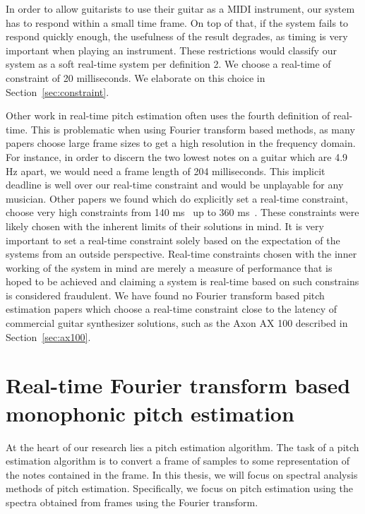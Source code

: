 \documentclass[a4paper,10pt,twocolumn]{article}
\begin{document}
In order to allow guitarists to use their guitar as a MIDI instrument, our system has to respond within a small time frame. On top of that, if the system fails to respond quickly enough, the usefulness of the result degrades, as timing is very important when playing an instrument. These restrictions would classify our system as a soft real-time system per definition 2. We choose a real-time of constraint of 20 milliseconds. We elaborate on this choice in Section~\ref{sec:constraint}.

Other work in real-time pitch estimation often uses the fourth definition of real-time. This is problematic when using Fourier transform based methods, as many papers choose large frame sizes to get a high resolution in the frequency domain. For instance, in order to discern the two lowest notes on a guitar which are 4.9 Hz apart, we would need a frame length of 204 milliseconds. This implicit deadline is well over our real-time constraint and would be unplayable for any musician. Other papers we found which do explicitly set a real-time constraint, choose very high constraints from 140 ms~\cite{sloomboi} up to 360 ms~\cite{sloomboi2}. These constraints were likely chosen with the inherent limits of their solutions in mind. It is very important to set a real-time constraint solely based on the expectation of the systems from an outside perspective. Real-time constraints chosen with the inner working of the system in mind are merely a measure of performance that is hoped to be achieved and claiming a system is real-time based on such constrains is considered fraudulent. We have found no Fourier transform based pitch estimation papers which choose a real-time constraint close to the latency of commercial guitar synthesizer solutions, such as the Axon AX 100 described in Section~\ref{sec:ax100}.



\section{Real-time Fourier transform based monophonic pitch estimation}
At the heart of our research lies a pitch estimation algorithm. The task of a pitch estimation algorithm is to convert a frame of samples to some representation of the notes contained in the frame. In this thesis, we will focus on spectral analysis methods of pitch estimation. Specifically, we focus on pitch estimation using the spectra obtained from frames using the Fourier transform.
\end{document}
